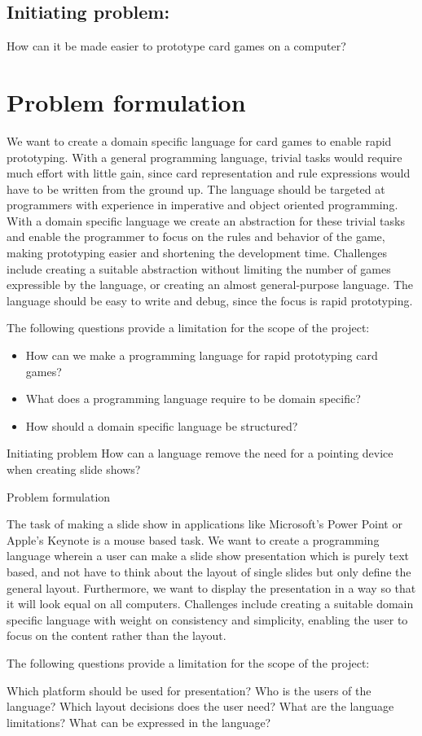 \section{Initiating problem:}
How can it be made easier to prototype card games on a computer? 
\chapter{Problem formulation}
We want to create a domain specific language for card games to enable rapid prototyping. With a 
general programming language, trivial tasks would require much effort with little gain, since card 
representation and rule expressions would have to be written from the ground up. The language should be targeted at programmers with experience in imperative and object oriented programming. With a domain specific language we create an abstraction for these trivial tasks and enable the programmer to focus on the rules and behavior of the game, making prototyping easier and shortening the development time. 
Challenges include creating a suitable abstraction without limiting the number of games expressible
by the language, or creating an almost general-purpose language. The language should be easy to write and debug, since the focus is rapid prototyping.

The following questions provide a limitation for the scope of the project:

\begin{itemize}
\item How can we make a programming language for rapid prototyping card games?
\item What does a programming language require to be domain specific?
\item How should a domain specific language be structured?
\end{itemize}



Initiating problem
How can a language remove the need for a pointing device when creating slide shows?

Problem formulation

The task of making a slide show in applications like Microsoft’s Power Point or Apple’s Keynote is a mouse based task. We want to create a programming language wherein a user can make a slide show presentation which is purely text based, and not have to think about the layout of single slides but only define the general layout. Furthermore, we want to display the presentation in a way so that it will look equal on all computers. 
Challenges include creating a suitable domain specific language with weight on consistency and simplicity, enabling the user to focus on the content rather than the layout.

The following questions provide a limitation for the scope of the project:

Which platform should be used for presentation?
Who is the users of the language?
Which layout decisions does the user need?
What are the language limitations? What can be expressed in the language?